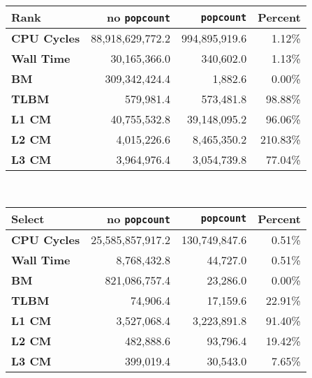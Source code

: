 \begin{tabular}{|l|r|r|r|}
\hline
\textbf{Rank} & no \texttt{popcount} & \texttt{popcount} & Percent \\ \hline
\textbf{CPU Cycles} & 88,918,629,772.2 & 994,895,919.6 & 1.12\% \\ \hline
\textbf{Wall Time} & 30,165,366.0 & 340,602.0 & 1.13\% \\ \hline
\textbf{BM} & 309,342,424.4 & 1,882.6 & 0.00\% \\ \hline
\textbf{TLBM} & 579,981.4 & 573,481.8 & 98.88\% \\ \hline
\textbf{L1 CM} & 40,755,532.8 & 39,148,095.2 & 96.06\% \\ \hline
\textbf{L2 CM} & 4,015,226.6 & 8,465,350.2 & 210.83\% \\ \hline
\textbf{L3 CM} & 3,964,976.4 & 3,054,739.8 & 77.04\% \\ \hline
\end{tabular}\\[5pt]
\begin{tabular}{|l|r|r|r|}
\hline
\textbf{Select} & no \texttt{popcount} & \texttt{popcount} & Percent \\ \hline
\textbf{CPU Cycles} & 25,585,857,917.2 & 130,749,847.6 & 0.51\% \\ \hline
\textbf{Wall Time} & 8,768,432.8 & 44,727.0 & 0.51\% \\ \hline
\textbf{BM} & 821,086,757.4 & 23,286.0 & 0.00\% \\ \hline
\textbf{TLBM} & 74,906.4 & 17,159.6 & 22.91\% \\ \hline
\textbf{L1 CM} & 3,527,068.4 & 3,223,891.8 & 91.40\% \\ \hline
\textbf{L2 CM} & 482,888.6 & 93,796.4 & 19.42\% \\ \hline
\textbf{L3 CM} & 399,019.4 & 30,543.0 & 7.65\% \\ \hline
\end{tabular}\\[5pt]
